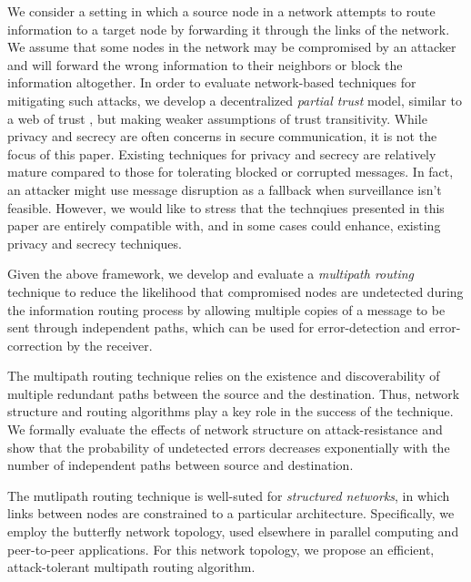 \documentclass[prodmode,permissions]{acmsmall-ec16}
\begin{document}
We consider a setting in which a source node in a network attempts to route information
to a target node by forwarding it through the links of the network. We 
assume that some nodes in the network may be compromised by an attacker 
and will forward the wrong information to their neighbors or
block the information altogether.
In order to evaluate network-based techniques for mitigating such attacks,
we develop a decentralized {\em partial trust} model,
similar to a web of trust
\cite{zimmermann_official_1995,ferguson_practical_2003},
but making weaker assumptions of trust transitivity.
While privacy and secrecy are often concerns in secure communication,
it is not the focus of this paper.
Existing techniques for privacy and secrecy are relatively mature compared
to those for tolerating blocked or corrupted messages.
In fact, an attacker might use message disruption as a fallback when
surveillance isn't feasible.
However, we would like to stress that the technqiues presented in this paper
are entirely compatible with, and in some cases could enhance, existing
privacy and secrecy techniques.

Given the above framework, we develop and evaluate a \emph{multipath routing} technique to reduce 
the likelihood that compromised nodes are undetected during the information 
routing process by allowing multiple copies of a message to be sent through independent paths,
which can be used for error-detection and error-correction by the receiver. 

The multipath routing technique relies on the existence and discoverability of
multiple redundant paths between the source and the destination. Thus, network 
structure and routing algorithms play a key role in the success of the technique.
We formally evaluate the 
effects of network structure on attack-resistance and show that the probability
of undetected 
errors decreases exponentially with the number of independent paths between 
source and destination.

The mutlipath routing technique is well-suted for {\em structured networks},
in which links between nodes are constrained to a particular architecture.
Specifically, we employ the butterfly network topology,
used elsewhere in parallel computing \cite{kshemkalyani_distributed_2008}
and peer-to-peer \cite{lua_survey_2005, korzun_structured_2013}
applications.
For this network topology,
we propose an efficient, attack-tolerant multipath routing algorithm.
\end{document}
